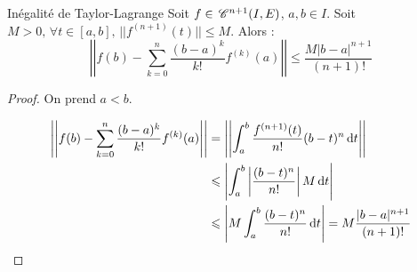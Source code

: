 \begin{proposition}{Inégalité de Taylor-Lagrange}{}
    Soit $f \in \,\mathscr C^{n + 1}(I, E)$, $a, b \in I$.  Soit $M > 0, \, \forall t \in [a, b], \, ||f^{(n + 1)}(t)|| \leqslant M$.
    Alors :
    \[\left|\left| f(b) - \sum_{k = 0 }^{n } \frac{(b - a)^k}{k!} f^{(k)}(a) \right|\right| \leqslant \frac{M |b - a|^{n + 1}}{(n + 1)!}\]
\end{proposition}

\begin{proof}
    On prend $a < b$.

    \begin{align*}
    \left|\left| f(b) - \sum_{k = 0}^n \frac{(b - a)^k}{k!} f^{(k)}(a) \right|\right|  & = \left|\left| \int_a^b \frac{f^{(n + 1)}(t)}{n!} (b - t)^n \,\mathrm{d}t \right|\right| \\
        & \leqslant \left| \int_a^b \left| \frac{(b - t)^n}{n!} \right| M \,\mathrm{d}t \right| \\
        & \leqslant \left| M \int_{a }^{b } \frac{(b - t)^n}{n!} \,\mathrm{d}t \right| = M \frac{|b - a|^{n + 1}}{(n+ 1)!}
    \end{align*}
\end{proof}
